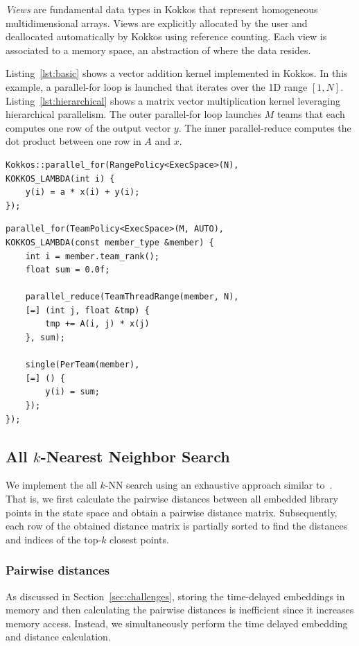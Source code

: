 \documentclass[sigconf]{acmart}
\begin{document}
\textit{Views} are fundamental data types in Kokkos that represent
homogeneous multidimensional arrays. Views are explicitly allocated by the
user and deallocated automatically by Kokkos using reference counting. Each
view is associated to a memory space, an abstraction of where the data
resides.

Listing~\ref{lst:basic} shows a vector addition  kernel implemented in Kokkos.
In this example, a parallel-for loop is launched that iterates over the 1D
range $[1,N]$.
Listing~\ref{lst:hierarchical} shows a matrix vector multiplication kernel
leveraging hierarchical parallelism. The outer parallel-for loop launches $M$ teams
that each computes one row of the output vector $y$. The inner parallel-reduce
computes the dot product between one row in $A$ and $x$.

\begin{lstlisting}[caption={Basic data parallel loop},label={lst:basic},float]
Kokkos::parallel_for(RangePolicy<ExecSpace>(N),
KOKKOS_LAMBDA(int i) {
    y(i) = a * x(i) + y(i);
});
\end{lstlisting}

\begin{lstlisting}[caption={Hierarchical data parallel loop},label={lst:hierarchical},float]
parallel_for(TeamPolicy<ExecSpace>(M, AUTO),
KOKKOS_LAMBDA(const member_type &member) {
    int i = member.team_rank();
    float sum = 0.0f;

    parallel_reduce(TeamThreadRange(member, N),
    [=] (int j, float &tmp) {
        tmp += A(i, j) * x(j)
    }, sum);

    single(PerTeam(member),
    [=] () {
        y(i) = sum;
    });
});
\end{lstlisting}

\subsection{All \texorpdfstring{$k$}{k}-Nearest Neighbor Search}

We implement the all $k$-NN search using an exhaustive approach similar
to~\cite{Garcia2010}. That is, we first calculate the pairwise
distances between all embedded library points in the state space and obtain a
pairwise distance matrix. Subsequently, each row of the obtained distance
matrix is partially sorted to find the distances and indices of the top-$k$
closest points.

\subsubsection{Pairwise distances}
As discussed in Section~\ref{sec:challenges}, storing the time-delayed
embeddings in memory and then calculating the pairwise distances is
inefficient since it increases memory access. Instead, we simultaneously
perform the time delayed embedding and distance calculation.
\end{document}
